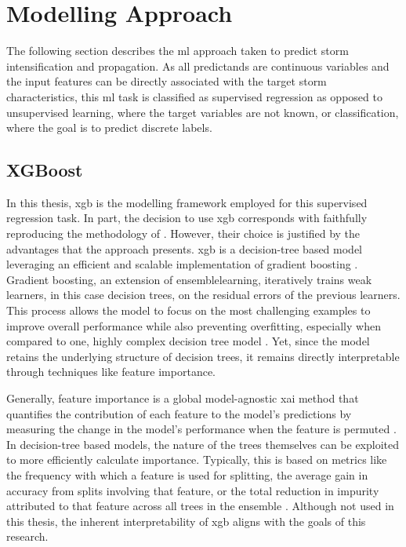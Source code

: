 \section{Modelling Approach}

The following section describes the \acrfull{ml} approach taken to predict storm intensification and propagation. As all predictands are continuous variables and the input features can be directly associated with the target storm characteristics, this \acrshort{ml} task is classified as supervised regression as opposed to unsupervised learning, where the target variables are not known, or classification, where the goal is to predict discrete labels.

\subsection{XGBoost}

In this thesis, \acrfull{xgb} is the modelling framework employed for this supervised regression task. In part, the decision to use \acrshort{xgb} corresponds with faithfully reproducing the methodology of \cite{Hunt2024}. However, their choice is justified by the advantages that the approach presents. \acrshort{xgb} is a decision-tree based model leveraging an efficient and scalable implementation of gradient boosting \citep{Chen2016}. Gradient boosting, an extension of \gls{ensemblelearning}, iteratively trains weak learners, in this case decision trees, on the residual errors of the previous learners. This process allows the model to focus on the most challenging examples to improve overall performance while also preventing overfitting, especially when compared to one, highly complex decision tree model \citep{Friedman2001}. Yet, since the model retains the underlying structure of decision trees, it remains directly interpretable through techniques like feature importance.

Generally, feature importance is a global model-agnostic \acrshort{xai} method that quantifies the contribution of each feature to the model's predictions by measuring the change in the model's performance when the feature is permuted \citep{Musolf2022}. In decision-tree based models, the nature of the trees themselves can be exploited to more efficiently calculate importance. Typically, this is based on metrics like the frequency with which a feature is used for splitting, the average gain in accuracy from splits involving that feature, or the total reduction in impurity attributed to that feature across all trees in the ensemble \citep{Louppe2013}. Although not used in this thesis, the inherent interpretability of \acrshort{xgb} aligns with the goals of this research.


